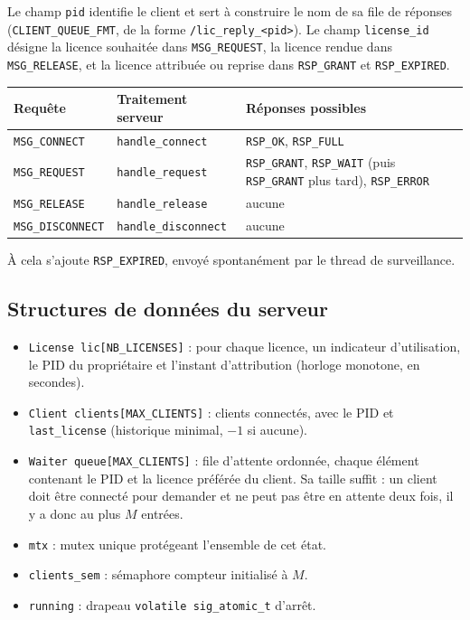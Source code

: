 \documentclass[11pt,a4paper]{article}
\newcommand{\code}[1]{\texttt{#1}}
\begin{document}
Le champ \code{pid} identifie le client et sert à construire le nom de sa file de réponses (\code{CLIENT\_QUEUE\_FMT}, de la forme \code{/lic\_reply\_<pid>}). Le champ \code{license\_id} désigne la licence souhaitée dans \code{MSG\_REQUEST}, la licence rendue dans \code{MSG\_RELEASE}, et la licence attribuée ou reprise dans \code{RSP\_GRANT} et \code{RSP\_EXPIRED}.

\medskip
\begin{tabularx}{\textwidth}{@{}llY@{}}
\toprule
\textbf{Requête} & \textbf{Traitement serveur} & \textbf{Réponses possibles}\\
\midrule
\code{MSG\_CONNECT} & \code{handle\_connect} & \code{RSP\_OK}, \code{RSP\_FULL}\\
\code{MSG\_REQUEST} & \code{handle\_request} & \code{RSP\_GRANT}, \code{RSP\_WAIT} (puis \code{RSP\_GRANT} plus tard), \code{RSP\_ERROR}\\
\code{MSG\_RELEASE} & \code{handle\_release} & aucune\\
\code{MSG\_DISCONNECT} & \code{handle\_disconnect} & aucune\\
\bottomrule
\end{tabularx}
\medskip

À cela s'ajoute \code{RSP\_EXPIRED}, envoyé spontanément par le thread de surveillance.

\subsection{Structures de données du serveur}

\begin{itemize}
  \item \code{License lic[NB\_LICENSES]} : pour chaque licence, un indicateur d'utilisation, le PID du propriétaire et l'instant d'attribution (horloge monotone, en secondes).
  \item \code{Client clients[MAX\_CLIENTS]} : clients connectés, avec le PID et \code{last\_license} (historique minimal, $-1$ si aucune).
  \item \code{Waiter queue[MAX\_CLIENTS]} : file d'attente ordonnée, chaque élément contenant le PID et la licence préférée du client. Sa taille suffit : un client doit être connecté pour demander et ne peut pas être en attente deux fois, il y a donc au plus $M$ entrées.
  \item \code{mtx} : mutex unique protégeant l'ensemble de cet état.
  \item \code{clients\_sem} : sémaphore compteur initialisé à $M$.
  \item \code{running} : drapeau \code{volatile sig\_atomic\_t} d'arrêt.
\end{itemize}
\end{document}
